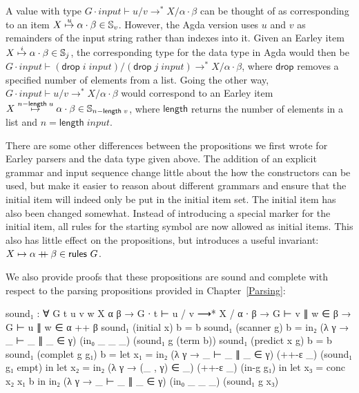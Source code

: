 \newcommand{\tdrop}{\mathsf{drop}}
\newcommand{\tlength}{\mathsf{length}}
\newcommand{\vinput}{\mathit{input}}
\newcommand{\rslash}{\mathrel{{}/{}}}


		A value with type $G \cdot \vinput \vdash u \rslash v \rightarrow^* X
		\rslash \alpha \cdot \beta$ can be thought of as corresponding to an item
		$X\overset{u}{\mapsto}\alpha\cdot\beta \in \mathbb{S}_v$. However, the Agda
		version uses $u$ and $v$ as remainders of the input string rather than
		indexes into it.  Given an Earley item {$X\overset{i}{\mapsto}\alpha\cdot\beta
		\in \mathbb{S}_j$, the corresponding type for the data type in Agda
		would then be $G \cdot \vinput \vdash
		(\tdrop\;i\;\vinput) \rslash (\tdrop\;j\;\vinput)
		\rightarrow^* X \rslash \alpha \cdot \beta$, where $\tdrop$ removes a specified number of
		elements from a list. Going the other way, $G \cdot \vinput
		\vdash u \rslash v \rightarrow^* X \rslash \alpha \cdot \beta$ would correspond to
		an Earley item $\earley{X}{\alpha}{\beta}{n -
		\tlength\;u} \in \mathbb{S}_{n -
		\tlength\;v}$}, where $\tlength$ returns the number of
		elements in a list and $n = \tlength\;\vinput$.

		There are some other differences between the propositions we first
		wrote for Earley parsers and the data type given above. The addition of
		an explicit grammar and input sequence change little about the how the
		constructors can be used, but make it easier to reason about different
		grammars and ensure that the initial item will indeed only be put in
		the initial item set. The initial item has also been changed somewhat.
		Instead of introducing a special marker for the initial item, all rules
		for the starting symbol are now allowed as initial items.  This also
		has little effect on the propositions, but introduces a useful
		invariant: $X \mapsto \alpha \mathbin{{+}\mspace{-8mu}{+}} \beta \in \textsf{rules } G$.

		We also provide proofs that these propositions are sound and complete
		with respect to the parsing propositions provided in
		Chapter~\ref{Parsing}:

		\begin{code}
			sound₁ : ∀ {G t u v w X α β} →
			  G ∙ t ⊢ u / v ⟶* X / α ∙ β →
			    G ⊢ v ∥ w ∈ β →
			    G ⊢ u ∥ w ∈ α ++ β
			sound₁ (initial x)     b = b
			sound₁ (scanner g)     b = in₂ (λ γ → _ ⊢ _ ∥ _ ∈ γ) (in₀ _ _ _) (sound₁ g (term b))
			sound₁ (predict x g)   b = b
			sound₁ (complet g g₁)  b =
			  let x₁ = in₂ (λ γ → _ ⊢ _ ∥ _ ∈ γ) (++-ε _) (sound₁ g₁ empt) in
			  let x₂ = in₂ (λ γ → (_ , γ) ∈ _) (++-ε _) (in-g g₁) in
			  let x₃ = conc x₂ x₁ b in
			  in₂ (λ γ → _ ⊢ _ ∥ _ ∈ γ) (in₀ _ _ _) (sound₁ g x₃)
		\end{code}

